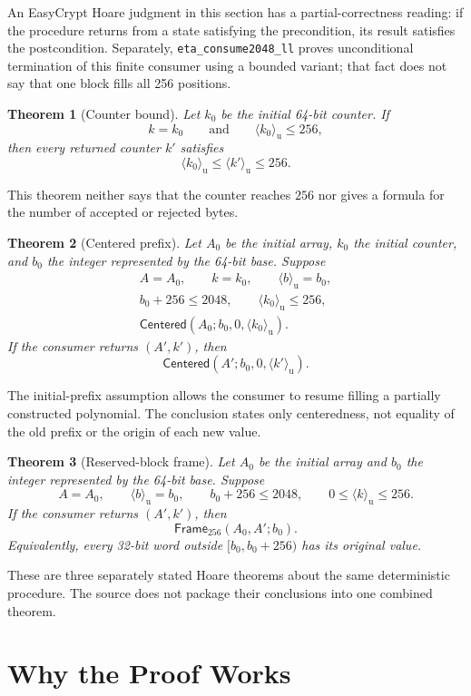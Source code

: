 \documentclass[11pt]{article}
\theoremstyle{definition}
\theoremstyle{plain}
\newtheorem{theorem}{Theorem}
\theoremstyle{remark}
\newcommand{\code}[1]{\nolinkurl{#1}}
\newcommand{\uint}[1]{\langle #1\rangle_{\mathrm u}}
\newcommand{\Frame}{\mathsf{Frame}_{256}}
\newcommand{\Centered}{\mathsf{Centered}}
\begin{document}
An EasyCrypt Hoare judgment in this section has a partial-correctness reading:
if the procedure returns from a state satisfying the precondition, its result
satisfies the postcondition.  Separately, \code{eta_consume2048_ll} proves
unconditional termination of this finite consumer using a bounded variant;
that fact does not say that one block fills all 256 positions.

\begin{theorem}[Counter bound]
Let $k_0$ be the initial 64-bit counter.  If
\[
  k=k_0
  \qquad\text{and}\qquad
  \uint{k_0}\le256,
\]
then every returned counter $k'$ satisfies
\[
  \uint{k_0}\le\uint{k'}\le256.
\]
\end{theorem}

This theorem neither says that the counter reaches $256$ nor gives a formula
for the number of accepted or rejected bytes.

\begin{theorem}[Centered prefix]
Let $A_0$ be the initial array, $k_0$ the initial counter, and $b_0$ the
integer represented by the 64-bit base.  Suppose
\[
\begin{gathered}
 A=A_0,\qquad k=k_0,\qquad \uint{b}=b_0,\\
 b_0+256\le2048,\qquad \uint{k_0}\le256,\\
 \Centered(A_0;b_0,0,\uint{k_0}).
\end{gathered}
\]
If the consumer returns $(A',k')$, then
\[
  \Centered(A';b_0,0,\uint{k'}).
\]
\end{theorem}

The initial-prefix assumption allows the consumer to resume filling a
partially constructed polynomial.  The conclusion states only centeredness,
not equality of the old prefix or the origin of each new value.

\begin{theorem}[Reserved-block frame]
Let $A_0$ be the initial array and $b_0$ the integer represented by the
64-bit base.  Suppose
\[
  A=A_0,\qquad \uint{b}=b_0,\qquad
  b_0+256\le2048,\qquad 0\le\uint{k}\le256.
\]
If the consumer returns $(A',k')$, then
\[
  \Frame(A_0,A';b_0).
\]
Equivalently, every 32-bit word outside
$[b_0,b_0+256)$ has its original value.
\end{theorem}

These are three separately stated Hoare theorems about the same deterministic
procedure.  The source does not package their conclusions into one combined
theorem.

\section{Why the Proof Works}
\end{document}
